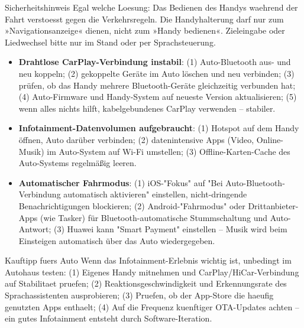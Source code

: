 \begin{tcbwarn}{Sicherheitshinweis}
Egal welche Loesung: Das Bedienen des Handys waehrend der Fahrt verstoesst gegen die Verkehrsregeln. Die Handyhalterung darf nur zum »Navigationsanzeige« dienen, nicht zum »Handy bedienen«. Zieleingabe oder Liedwechsel bitte nur im Stand oder per Sprachsteuerung.

\end{tcbwarn}


\begin{itemize}
  \item \textbf{Drahtlose CarPlay-Verbindung instabil}: (1) Auto-Bluetooth aus- und neu koppeln; (2) gekoppelte Geräte im Auto löschen und neu verbinden; (3) prüfen, ob das Handy mehrere Bluetooth-Geräte gleichzeitig verbunden hat; (4) Auto-Firmware und Handy-System auf neueste Version aktualisieren; (5) wenn alles nichts hilft, kabelgebundenes CarPlay verwenden – stabiler.
  \item \textbf{Infotainment-Datenvolumen aufgebraucht}: (1) Hotspot auf dem Handy öffnen, Auto darüber verbinden; (2) datenintensive Apps (Video, Online-Musik) im Auto-System auf Wi-Fi umstellen; (3) Offline-Karten-Cache des Auto-Systems regelmäßig leeren.
  \item \textbf{Automatischer Fahrmodus}: (1) iOS-"Fokus" auf "Bei Auto-Bluetooth-Verbindung automatisch aktivieren" einstellen, nicht-dringende Benachrichtigungen blockieren; (2) Android-"Fahrmodus" oder Drittanbieter-Apps (wie Tasker) für Bluetooth-automatische Stummschaltung und Auto-Antwort; (3) Huawei kann "Smart Payment" einstellen – Musik wird beim Einsteigen automatisch über das Auto wiedergegeben.
\end{itemize}

\begin{tcbinfo}{Kauftipp fuers Auto}
Wenn das Infotainment-Erlebnis wichtig ist, unbedingt im Autohaus testen: (1) Eigenes Handy mitnehmen und CarPlay/HiCar-Verbindung auf Stabilitaet pruefen; (2) Reaktionsgeschwindigkeit und Erkennungsrate des Sprachassistenten ausprobieren; (3) Pruefen, ob der App-Store die haeufig genutzten Apps enthaelt; (4) Auf die Frequenz kuenftiger OTA-Updates achten – ein gutes Infotainment entsteht durch Software-Iteration.

\end{tcbinfo}

